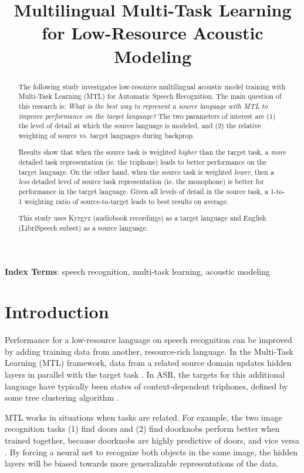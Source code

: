 \documentclass[a4paper]{article}
\title{Multilingual Multi-Task Learning for Low-Resource Acoustic Modeling}
\begin{document}
\maketitle
% 
\begin{abstract}

  The following study investigates low-resource multilingual acoustic model training with Multi-Task Learning (MTL) for Automatic Speech Recognition. The main question of this research is: \textit{What is the best way to represent a source language with MTL to improve performance on the target language?} The two parameters of interest are (1) the level of detail at which the source language is modeled, and (2) the relative weighting of source vs. target languages during backprop.

Results show that when the source task is weighted \textit{higher} than the target task, a \textit{more} detailed task representation (ie. the triphone) leads to better performance on the target language. On the other hand, when the source task is weighted \textit{lower}, then a \textit{less} detailed level of source task representation (ie. the monophone) is better for performance in the target language. Given all levels of detail in the source task, a 1-to-1 weighting ratio of source-to-target leads to best results on average.

This study uses Kyrgyz (audiobook recordings) as a target language and English (LibriSpeech subset) as a source language.
\end{abstract}

\noindent\textbf{Index Terms}: speech recognition, multi-task learning, acoustic modeling





\section{Introduction}

Performance for a low-resource language on speech recognition can be improved by adding training data from another, resource-rich language. In the Multi-Task Learning (MTL) framework, data from a related source domain updates hidden layers in parallel with the target task \cite{caruana1997}. In ASR, the targets for this additional language have typically been states of context-dependent triphones, defined by some tree clustering algorithm \cite{huang2013,heigold2013,grezl2016}.

MTL works in situations when tasks are related. For example, the two image recognition tasks (1) find doors and (2) find doorknobs perform better when trained together, because doorknobs are highly predictive of doors, and vice versa \cite{caruana1997}. By forcing a neural net to recognize both objects in the same image, the hidden layers will be biased towards more generalizable representations of the data.
\end{document}
